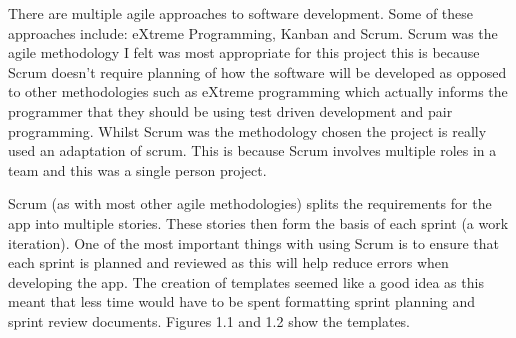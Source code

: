 There are multiple  agile approaches to software development. Some of these approaches include: eXtreme Programming, Kanban and Scrum. Scrum was the agile methodology I felt was most appropriate for this project this is because Scrum doesn't require planning of how the software will be developed as opposed to other methodologies such as eXtreme programming which actually informs the programmer that they should be using test driven development and pair programming. Whilst Scrum was the methodology chosen the project is really used an adaptation of scrum. This is because Scrum involves multiple roles in a team and this was a single person project. \cite{ask}

Scrum (as with most other agile methodologies) splits the requirements for the app into multiple stories. These stories then form the basis of each sprint (a work iteration)\cite{sg}. One of the most important things with using Scrum is to ensure that each sprint is planned and reviewed as this will help reduce errors when developing the app. The creation of templates seemed like a good idea as this meant that less time would have to be spent formatting sprint planning and sprint review documents. Figures 1.1 and 1.2 show the templates.

